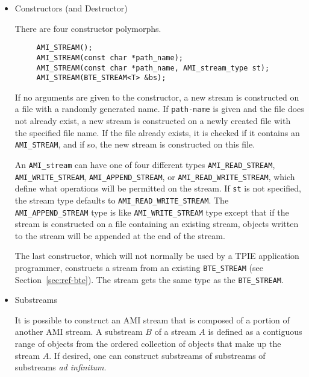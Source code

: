 \begin{itemize}
\item{Constructors (and Destructor)}

There are four constructor polymorphs.

\begin{verbatim}
     AMI_STREAM();
     AMI_STREAM(const char *path_name);
     AMI_STREAM(const char *path_name, AMI_stream_type st);
     AMI_STREAM(BTE_STREAM<T> &bs);
\end{verbatim}


 If
no arguments are given to the constructor, a new stream 
is constructed on a file with a randomly generated name. If
\verb|path-name| is given and the file does not already
exist, a new stream is constructed on a newly created file
with the specified file name. If the file already exists, it
is checked if it contains an \verb|AMI_STREAM|, and if so,
the new stream is constructed on this file. 

An \verb|AMI_stream| can have one of four different types
\verb|AMI_READ_STREAM|, \verb|AMI_WRITE_STREAM|,
\verb|AMI_APPEND_STREAM|, or \verb|AMI_READ_WRITE_STREAM|,
which define what operations will be permitted on the
stream. If \verb|st| is not
specified, the stream type defaults to
\verb|AMI_READ_WRITE_STREAM|. The \verb|AMI_APPEND_STREAM|
type is like \verb|AMI_WRITE_STREAM| type except that if the stream is constructed on a
file containing an existing stream, objects written to the
stream will be appended at the end of the stream.

The last constructor, which will not normally be used by a
TPIE application programmer, constructs a stream from an existing
\verb|BTE_STREAM| (see Section~\ref{sec:ref-bte}). The
stream gets the same type as the \verb|BTE_STREAM|.


\item{Substreams}

It is possible to construct an AMI stream that is composed
of a portion of another AMI stream. A substream $B$ of a
stream $A$ is defined as a contiguous range of objects from
the ordered collection of objects that make up the stream
$A$.  If desired, one can construct substreams of substreams
of substreams {\em ad infinitum}.


\end{itemize}
